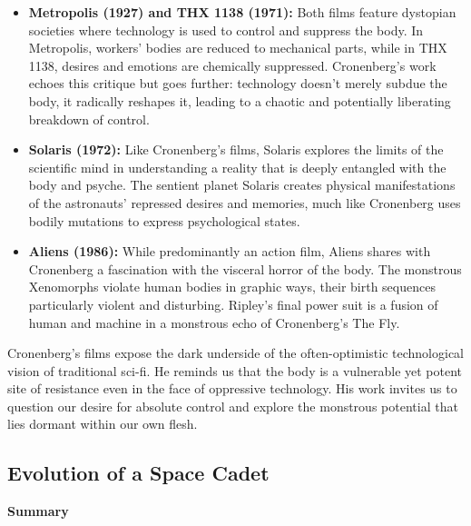 \documentclass[11pt,fleqn]{book}
\begin{document}
\begin{itemize}
\item \textbf{Metropolis (1927) and THX 1138 (1971):} Both films feature dystopian societies where technology is used to control and suppress the body. In Metropolis, workers' bodies are reduced to mechanical parts, while in THX 1138, desires and emotions are chemically suppressed. Cronenberg's work echoes this critique but goes further: technology doesn't merely subdue the body, it radically reshapes it, leading to a chaotic and potentially liberating breakdown of control. 

\item \textbf{Solaris (1972):}  Like Cronenberg's films, Solaris explores the limits of the scientific mind in understanding a reality that is deeply entangled with the body and psyche. The sentient planet Solaris creates physical manifestations of the astronauts' repressed desires and memories, much like Cronenberg uses bodily mutations to express psychological states.

\item \textbf{Aliens (1986):}  While predominantly an action film, Aliens shares with Cronenberg a fascination with the visceral horror of the body. The monstrous Xenomorphs violate human bodies in graphic ways, their birth sequences particularly violent and disturbing. Ripley's final power suit is a fusion of human and machine in a monstrous echo of Cronenberg's The Fly.
\end{itemize}

\vspace{5pt}

Cronenberg's films expose the dark underside of the often-optimistic technological vision of traditional sci-fi. He reminds us that the body is a vulnerable yet potent site of resistance even in the face of oppressive technology. His work invites us to question our desire for absolute control and explore the monstrous potential that lies dormant within our own flesh. 



\subsection{Evolution of a Space Cadet}
\textbf{Summary}
\end{document}
